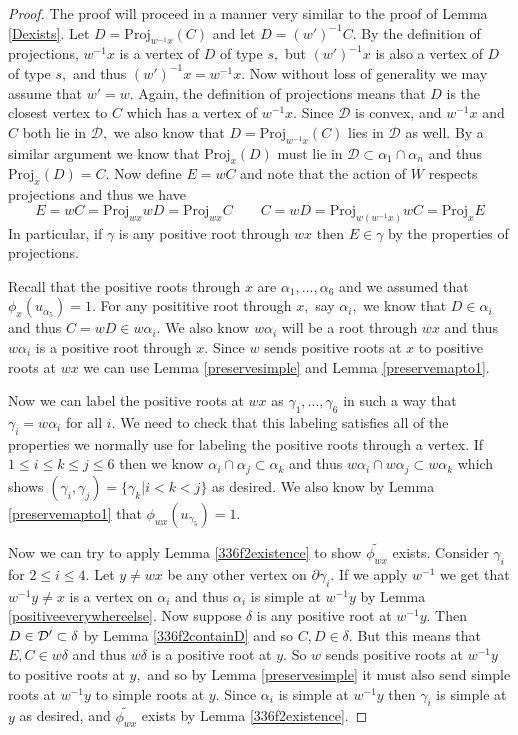 \documentclass[class=book, crop=false]{standalone}
\begin{document}
\begin{proof}
	The proof will proceed in a manner very similar to the proof of Lemma \ref{Dexists}. Let $D=\mathrm{Proj}_{w^{-1}x}(C)$ and let $D=(w')^{-1}C.$ By the definition of projections, $w^{-1}x$ is a vertex of $D$ of type $s,$ but $(w')^{-1}x$ is also a vertex of $D$ of type $s,$ and thus $(w')^{-1}x=w^{-1}x.$ Now without loss of generality we may assume that $w'=w.$ Again, the definition of projections means that $D$ is the closest vertex to $C$ which has a vertex of $w^{-1}x.$ Since $\mathcal{D}$ is convex, and $w^{-1}x$ and $C$ both lie in $\mathcal{D},$ we also know that $D=\mathrm{Proj}_{w^{-1}x}(C)$ lies in $\mathcal{D}$ as well. By a similar argument we know that $\mathrm{Proj}_{x}(D)$ must lie in $\mathcal{D}\subset \alpha_1\cap \alpha_n$ and thus $\mathrm{Proj}_{x}(D)=C.$ Now define $E=wC$ and note that the action of $W$ respects projections and thus we have
	\[
		E=wC=\mathrm{Proj}_{wx}{wD}=\mathrm{Proj}_{wx}{C} \qquad C=wD=\mathrm{Proj}_{w(w^{-1}x)}{wC}=\mathrm{Proj}_{x}{E}
	\]
In particular, if $\gamma$ is any positive root through $wx$ then $E\in \gamma$ by the properties of projections.

Recall that the positive roots through $x$ are $\alpha_1,\dots,\alpha_6$ and we assumed that $\phi_x(u_{\alpha_5})=1.$ For any posititive root through $x,$ say $\alpha_i,$ we know that $D\in \alpha_i$ and thus $C=wD\in w\alpha_i.$ We also know $w\alpha_i$ will be a root through $wx$ and thus $w\alpha_i$ is a positive root through $x.$ Since $w$ sends positive roots at $x$ to positive roots at $wx$ we can use Lemma \ref{preservesimple} and Lemma \ref{preservemapto1}.

Now we can label the positive roots at $wx$ as $\gamma_1,\dots,\gamma_6$ in such a way that $\gamma_i=w\alpha_i$ for all $i.$ We need to check that this labeling satisfies all of the properties we normally use for labeling the positive roots through a vertex. If $1\le i\le k\le j\le 6$ then we know $\alpha_i\cap \alpha_j\subset \alpha_k$ and thus $w\alpha_i\cap w\alpha_j\subset w\alpha_k$ which shows $(\gamma_i,\gamma_j)=\{\gamma_k|i<k<j\}$ as desired. We also know by Lemma \ref{preservemapto1} that $\phi_{wx}(u_{\gamma_5})=1.$ 

Now we can try to apply Lemma \ref{336f2existence} to show $\tilde{\phi_{wx}}$ exists. Consider $\gamma_i$ for $2\le i\le 4.$ Let $y\neq wx$ be any other vertex on $\partial\gamma_i.$ If we apply $w^{-1}$ we get that $w^{-1}y\neq x$ is a vertex on $\alpha_i$ and thus $\alpha_i$ is simple at $w^{-1}y$ by Lemma \ref{positiveeverywhereelse}. Now suppose $\delta$ is any positive root at $w^{-1}y.$ Then $D\in \mathcal{D}'\subset \delta$ by Lemma \ref{336f2containD} and so $C,D\in \delta.$ But this means that $E,C\in w\delta$ and thus $w\delta$ is a positive root at $y.$ So $w$ sends positive roots at $w^{-1}y$ to positive roots at $y,$ and so by Lemma \ref{preservesimple} it must also send simple roots at $w^{-1}y$ to simple roots at $y.$ Since $\alpha_i$ is simple at $w^{-1}y$ then $\gamma_i$ is simple at $y$ as desired, and $\tilde{\phi_{wx}}$ exists by Lemma \ref{336f2existence}.

\end{proof}
\end{document}
